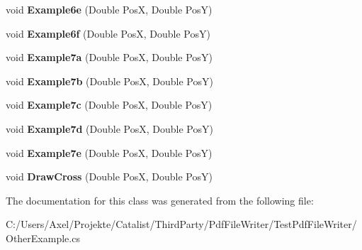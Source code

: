 \begin{DoxyCompactItemize}
\item 
void {\bfseries Example6e} (Double PosX, Double PosY)\hypertarget{class_test_pdf_file_writer_1_1_other_example_a8127172ad9e054891ef6fc3578fd08da}{}\label{class_test_pdf_file_writer_1_1_other_example_a8127172ad9e054891ef6fc3578fd08da}

\item 
void {\bfseries Example6f} (Double PosX, Double PosY)\hypertarget{class_test_pdf_file_writer_1_1_other_example_a831939077a58f98584bd704b4fff4b6f}{}\label{class_test_pdf_file_writer_1_1_other_example_a831939077a58f98584bd704b4fff4b6f}

\item 
void {\bfseries Example7a} (Double PosX, Double PosY)\hypertarget{class_test_pdf_file_writer_1_1_other_example_a85c957892817151e6eb5a064564f6d94}{}\label{class_test_pdf_file_writer_1_1_other_example_a85c957892817151e6eb5a064564f6d94}

\item 
void {\bfseries Example7b} (Double PosX, Double PosY)\hypertarget{class_test_pdf_file_writer_1_1_other_example_a79edfb714cc6ef145f42d9fd34b44f60}{}\label{class_test_pdf_file_writer_1_1_other_example_a79edfb714cc6ef145f42d9fd34b44f60}

\item 
void {\bfseries Example7c} (Double PosX, Double PosY)\hypertarget{class_test_pdf_file_writer_1_1_other_example_ab70c5c2de57c38a5c5fdbc6c0120dea6}{}\label{class_test_pdf_file_writer_1_1_other_example_ab70c5c2de57c38a5c5fdbc6c0120dea6}

\item 
void {\bfseries Example7d} (Double PosX, Double PosY)\hypertarget{class_test_pdf_file_writer_1_1_other_example_a244c07b5afec6094d079e4f594335bff}{}\label{class_test_pdf_file_writer_1_1_other_example_a244c07b5afec6094d079e4f594335bff}

\item 
void {\bfseries Example7e} (Double PosX, Double PosY)\hypertarget{class_test_pdf_file_writer_1_1_other_example_a8571a02dbd53cc3daf16ae18fef3146f}{}\label{class_test_pdf_file_writer_1_1_other_example_a8571a02dbd53cc3daf16ae18fef3146f}

\item 
void {\bfseries Draw\+Cross} (Double PosX, Double PosY)\hypertarget{class_test_pdf_file_writer_1_1_other_example_ab0f50182a32949c06d4fb4afaa540270}{}\label{class_test_pdf_file_writer_1_1_other_example_ab0f50182a32949c06d4fb4afaa540270}

\end{DoxyCompactItemize}


The documentation for this class was generated from the following file\+:\begin{DoxyCompactItemize}
\item 
C\+:/\+Users/\+Axel/\+Projekte/\+Catalist/\+Third\+Party/\+Pdf\+File\+Writer/\+Test\+Pdf\+File\+Writer/Other\+Example.\+cs\end{DoxyCompactItemize}
